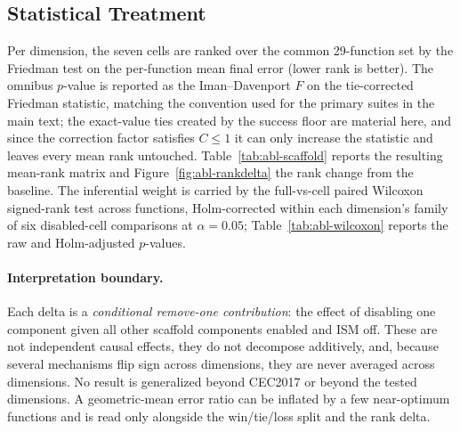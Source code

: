 \documentclass[algorithms,article,submit,moreauthors,pdftex]{Definitions/mdpi}
\begin{document}
\subsection{Statistical Treatment}\label{sec:supp:ablation:stats}

Per dimension, the seven cells are ranked over the common 29-function set by
the Friedman test on the
per-function mean final error (lower rank is better).  The omnibus
$p$-value is reported as the Iman--Davenport $F$ on the tie-corrected
Friedman statistic, matching the convention used for the primary suites in
the main text; the exact-value ties created by the success floor are
material here, and since the correction factor satisfies $C \leq 1$ it can
only increase the statistic and leaves every mean rank untouched.
Table~\ref{tab:abl-scaffold} reports the resulting mean-rank matrix and
Figure~\ref{fig:abl-rankdelta} the rank change from the baseline.  The
inferential weight is carried by the full-vs-cell paired Wilcoxon signed-rank
test across functions, Holm-corrected
within each dimension's family of six disabled-cell
comparisons at $\alpha = 0.05$; Table~\ref{tab:abl-wilcoxon} reports the raw
and Holm-adjusted $p$-values.

\paragraph{Interpretation boundary.}
Each delta is a \emph{conditional remove-one contribution}: the effect of
disabling one component given all other scaffold components enabled and ISM
off.  These are not independent causal effects, they do not decompose
additively, and, because several mechanisms flip sign across dimensions,
they are never averaged across dimensions.  No result is generalized beyond
CEC2017 or beyond the tested dimensions.  A geometric-mean error ratio can be
inflated by a few near-optimum functions and is read only alongside the
win/tie/loss split and the rank delta.

\begin{table}[H]
\caption{Scaffold remove-one ablation on CEC2017: mean Friedman rank of each
cell per dimension, with the change $\Delta$ versus the full-scaffold
baseline in parentheses (positive $=$ removing the component degrades
rank; lower rank is better).  Seven cells, 29 functions, 51 runs per
(cell, function, dimension), \textbf{ISM off in every cell}.  Each $\Delta$
is a \emph{conditional} remove-one contribution (conditional on all other
components enabled and ISM off), not an independent causal effect; signs
differ across dimensions, so no value is averaged over dimensions.
$^{\ast}$ marks a contrast that is Holm-significant within its dimension
($\alpha = 0.05$; Table~\ref{tab:abl-wilcoxon}).  }\label{tab:abl-scaffold}
\centering
\tablesize{\footnotesize}

\end{table}
\end{document}
